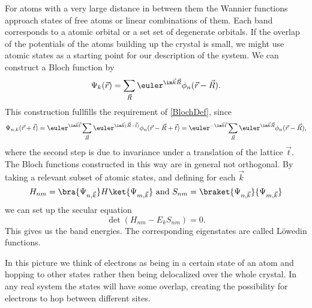 \documentclass[a4paper,10pt]{report}
\begin{document}
For atoms with a very large distance in between them the Wannier functions approach states of free atoms or linear combinations of them.
Each band corresponds to a atomic orbital or a set set of degenerate orbitals.
If the overlap of the potentials of the atoms building up the crystal is small, we might use atomic states as a starting point for our description of the system.
We can construct a Bloch function by
\begin{equation}
 \Psi_k(\vec{r}) = \sum_{\vec{R}} \euler^{\im \vec{k}\vec{R} }  \phi_{n}(\vec{r}-\vec{R}). 
\end{equation}
This construction fullfills the requirement of \ref{BlochDef}, since
\begin{equation}
 \Psi_{n,k}(\vec{r}+\vec{t}) 
 = \euler^{\im \vec{k} \vec{t} } \sum_{\vec{R}} \euler^{\im \vec{k} (\vec{R}-\vec{t})} \phi_n (\vec{r}-\vec{R}+\vec{t}) 
 = \euler^{-\im \vec{k} \vec{t} } \sum_{\vec{R}} \euler^{\im \vec{k}\vec{R} }  \phi_{n}(\vec{r}-\vec{R}), 
\end{equation}
where the second step is due to invariance under a translation of the lattice $\vec{t}$.
The Bloch functions constructed in this way are in general not orthogonal.
By taking a relevant subset of atomic states, and defining for each $\vec{k}$
\begin{equation}
 H_{nm} = \bra{\Psi_{n,\vec{k}}} H \ket{\Psi_{m,\vec{k}}} \text{  and  } S_{nm} = \braket{\Psi_{n,\vec{k}}}{\Psi_{m,\vec{k}}}
\end{equation}
we can set up the secular equation
\begin{equation}
 \det(H_{nm}-E_kS_{nm})=0.
\end{equation}
This gives us the band energies. The corresponding eigenstates are called Löwedin functions.



In this picture we think of electrons as being in a certain state of an atom and hopping to other states rather then being delocalized over the whole crystal.
In any real system the states will have some overlap, creating the possibility for electrons to hop between different sites.
\end{document}
